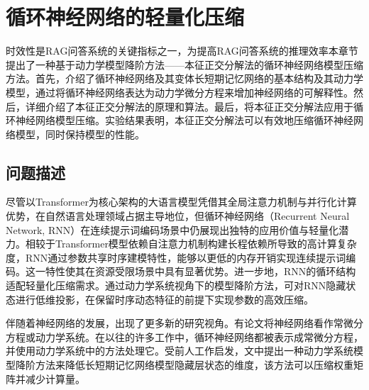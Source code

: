 \chapter{循环神经网络的轻量化压缩}
\label{cha:第三章}
时效性是RAG问答系统的关键指标之一，为提高RAG问答系统的推理效率本章节提出了一种基于动力学模型降阶方法——本征正交分解法的循环神经网络模型压缩方法。首先，介绍了循环神经网络及其变体长短期记忆网络的基本结构及其动力学模型，通过将循环神经网络表达为动力学微分方程来增加神经网络的可解释性。然后，详细介绍了本征正交分解法的原理和算法。最后，将本征正交分解法应用于循环神经网络模型压缩。实验结果表明，本征正交分解法可以有效地压缩循环神经网络模型，同时保持模型的性能。
\section{问题描述}
尽管以Transformer为核心架构的大语言模型凭借其全局注意力机制与并行化计算优势，在自然语言处理领域占据主导地位，但循环神经网络（Recurrent Neural Network, RNN）在连续提示词编码场景中仍展现出独特的应用价值与轻量化潜力\cite{liu2024gpt,liu2022p}。相较于Transformer模型依赖自注意力机制构建长程依赖所导致的高计算复杂度，RNN通过参数共享时序建模特性，能够以更低的内存开销实现连续提示词编码。这一特性使其在资源受限场景中具有显著优势。进一步地，RNN的循环结构适配轻量化压缩需求。通过动力学系统视角下的模型降阶方法，可对RNN隐藏状态进行低维投影，在保留时序动态特征的前提下实现参数的高效压缩。

伴随着神经网络的发展，出现了更多新的研究视角。有论文将神经网络看作常微分方程或动力学系统\cite{chen2018neural}。在以往的许多工作中，循环神经网络都被表示成常微分方程\cite{rubanova2019latent,mozer2017discrete}，并使用动力学系统中的方法处理它。受前人工作启发，文中提出一种动力学系统模型降阶方法来降低长短期记忆网络模型隐藏层状态的维度，该方法可以压缩权重矩阵并减少计算量。

